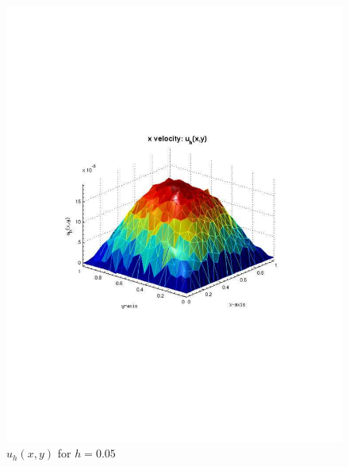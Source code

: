 \documentclass[12pt]{article}
\begin{document}
                \begin{figure}[htb]
                    \begin{center}
                \includegraphics[scale=0.50]{./../files/box/2u.pdf}
                \caption{$u_h(x,y)$ for $h = 0.05$}
            \end{center}
            \end{figure}
\end{document}
